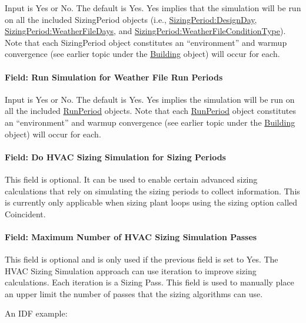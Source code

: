 Input is Yes or No. The default is Yes. Yes implies that the simulation will be run on all the included SizingPeriod objects (i.e., \hyperref[sizingperioddesignday]{Sizing\-Period:\-Design\-Day}, \hyperref[sizingperiodweatherfiledays]{Sizing\-Period:\-Weather\-File\-Days}, and \hyperref[sizingperiodweatherfileconditiontype]{Sizing\-Period:\-Weather\-File\-Condition\-Type}). Note that each Sizing\-Period object constitutes an ``environment'' and warmup convergence (see earlier topic under the \hyperref[building]{Building} object) will occur for each.

\paragraph{Field: Run Simulation for Weather File Run Periods}\label{field-run-simulation-for-weather-file-run-periods}

Input is Yes or No. The default is Yes. Yes implies the simulation will be run on all the included \hyperref[runperiod]{RunPeriod} objects. Note that each \hyperref[runperiod]{RunPeriod} object constitutes an ``environment'' and warmup convergence (see earlier topic under the \hyperref[building]{Building} object) will occur for each.

\paragraph{Field: Do HVAC Sizing Simulation for Sizing Periods}\label{field-do-hvac-sizing-simulation-for-sizing-periods}

This field is optional. It can be used to enable certain advanced sizing calculations that rely on simulating the sizing periods to collect information. This is currently only applicable when sizing plant loops using the sizing option called Coincident.

\paragraph{Field: Maximum Number of HVAC Sizing Simulation Passes}\label{field-maximum-number-of-hvac-sizing-simulation-passes}

This field is optional and is only used if the previous field is set to Yes. The HVAC Sizing Simulation approach can use iteration to improve sizing calculations. Each iteration is a Sizing Pass. This field is used to manually place an upper limit the number of passes that the sizing algorithms can use.

An IDF example:


